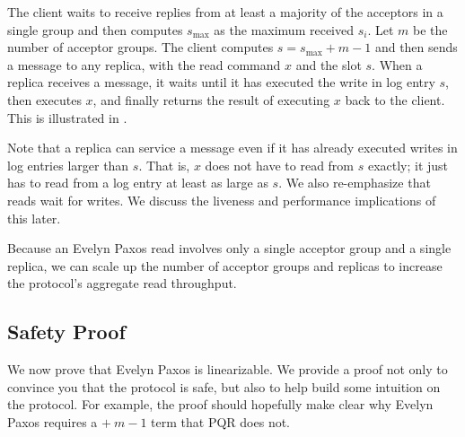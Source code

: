 The client waits to receive  replies from at least a
majority of the acceptors in a single group and then computes $s_\text{max}$ as
the maximum received $s_i$. Let $m$ be the number of acceptor groups. The
client computes $s = s_\text{max} + m - 1$ and then sends a 
message to any replica, with the read command $x$ and the slot $s$.
%
When a replica receives a  message, it waits until it has
executed the write in log entry $s$, then executes $x$, and finally returns the
result of executing $x$ back to the client. This is illustrated in
.

Note that a replica can service a  message even if it has
already executed writes in log entries larger than $s$. That is, $x$ does not
have to read from $s$ exactly; it just has to read from a log entry at least as
large as $s$. We also re-emphasize that reads wait for writes. We discuss the
liveness and performance implications of this later.

{}

Because an Evelyn Paxos read involves only a single acceptor group and a single
replica, we can scale up the number of acceptor groups and replicas to increase
the protocol's aggregate read throughput.


\subsection{Safety Proof}
We now prove that Evelyn Paxos is linearizable. We provide a proof not only to
convince you that the protocol is safe, but also to help build some intuition
on the protocol. For example, the proof should hopefully make clear why Evelyn
Paxos requires a $+\ m - 1$ term that PQR does not.


